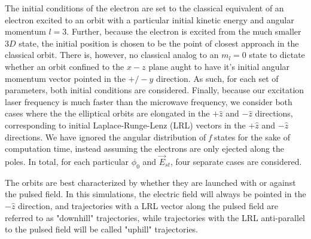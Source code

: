 \documentclass[aps,pra,preprint,groupedaddress]{revtex4-1}
\begin{document}
The initial conditions of the electron are set to the classical equivalent of an electron excited to an orbit with a particular initial kinetic energy and angular momentum $l = 3$. Further, because the electron is excited from the much smaller $3D$ state, the initial position is chosen to be the point of closest approach in the classical orbit. There is, however, no classical analog to an $m_l = 0$ state to dictate whether an orbit confined to the $x-z$ plane aught to have it's initial angular momentum vector pointed in the $+/- \hat{y}$ direction. As such, for each set of parameters, both initial conditions are considered. Finally, because our excitation laser frequency is much faster than the microwave frequency, we consider both cases where the the elliptical orbits are elongated in the $+ \hat{z}$ and $-\hat{z}$ directions, corresponding to initial Laplace-Runge-Lenz (LRL) vectors in the $+\hat{z}$ and $-\hat{z}$ directions. We have ignored the angular distribution of \emph{f} states for the sake of computation time, instead assuming the electrons are only ejected along the poles. In total, for each particular $\phi_0$ and $\vec{E}_{st}$, four separate cases are considered.

The orbits are best characterized by whether they are launched with or against the pulsed field. In this simulations, the electric field will always be pointed in the $-\hat{z}$ direction, and trajectories with a LRL vector along the pulsed field are referred to as "downhill" trajectories, while trajectories with the LRL anti-parallel to the pulsed field will be called "uphill" trajectories.
\end{document}
